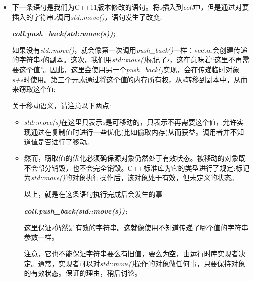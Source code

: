 \begin{itemize}
\begin{enumerate}
    \item 语句的结尾，临时字符串\textit{s+s}被销毁。但由于临时字符串不再是初始内存的所有者，析构函数不会释放该内存。\par
{}
    我们优化了复制过程，将\textit{s+s}的内存所有权转移到它在vector中的副本。\par
    这一切都是通过编译器自动完成的，编译器可以对即将死亡的对象发出信号，可以使用新实现来复制一个从源端窃取值的字符串值。这不是一个技巧，这是一种语义上的移动，通过从底层技术上将值的内存从源字符串移动到它的副本来实现。\par
  \end{enumerate}
  \item 下一条语句是我们为C++11版本修改的语句。将\textit{s}插入到\textit{coll}中，但是通过对要插入的字符串\textit{s}调用\textit{std::move()}，语句发生了改变:\par
  \textit{\textbf{coll.push\_\allowbreak{}back(\allowbreak{}std::\allowbreak{}move(\allowbreak{}s)\allowbreak{})\allowbreak{};}}\par
  如果没有\textit{std::move()}，就会像第一次调用\textit{push\_\allowbreak{}back(\allowbreak{})\allowbreak{}}一样：vector会创建传递的字符串\textit{s}的副本。这次，我们用\textit{std::move()}标记了\textit{s}，这在意味着“这里不再需要这个值”。因此，这里会使用另一个\textit{push\_\allowbreak{}back(\allowbreak{})\allowbreak{}}实现，会在传递临时对象\textit{s+s}时使用。第三个元素通过将这个值的内存所有权，从\textit{s}转移到副本中，从而来窃取这个值:\par
{}
  关于移动语义，请注意以下两点:\par
  \begin{itemize}
    \item[-] \textit{std::\allowbreak{}move(\allowbreak{}s)\allowbreak{}}在这里只表示\textit{s}是可移动的，只表示不再需要这个值，允许实现通过在复制值时进行一些优化(比如偷取内存)从而获益。调用者并不知道值是否进行了移动。
    \item[-] 然而，窃取值的优化必须确保源对象仍然处于有效状态。被移动的对象既不会部分销毁，也不会完全销毁。C++标准库为它的类型进行了规定:标记为\textit{std::move()}的对象执行操作后，该对象处于有效，但未定义的状态。\par
    以上，就是在这条语句执行完成后会发生的事\par
    \textit{\textbf{coll.push\_\allowbreak{}back(\allowbreak{}std::\allowbreak{}move(\allowbreak{}s)\allowbreak{})\allowbreak{};}}\par
    这里保证\textit{s}仍然是有效的字符串。这就像使用不知道传递了哪个值的字符串参数一样。\par
    注意，它也不能保证字符串要么有旧值，要么为空，由运行时库实现者决定。通常，实现者可以对\textit{std::move()}操作的对象做任何事，只要保持对象的有效状态。保证的理由，稍后讨论。
  \end{itemize}


\end{itemize}
